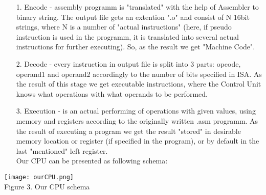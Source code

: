 \documentclass[11pt,a4paper]{article}
\begin{document}
\begin{enumerate}
	\item[1.] Encode - assembly programm is "translated" with the help of  Assembler to binary string. The output file gets an extention ".o" and consist of N 16bit strings, where N is a number of "actual instructions" (here, if pseudo instruction is used in the programm, it is translated into several actual instructions for further executing). So, as the result we get "Machine Code".
	\item[2.] Decode - every instruction in output file is split into 3 parts: opcode, operand1 and operand2 accordingly to the number of bits specified in ISA. As the result of this stage we get executable instructions, where the Control Unit knows what operations with what operands to be performed. 
	\item[3.] Execution - is an actual performing of operations with given values, using memory and registers according to the originally written .asm programm. As the result of executing a program we get the result "stored" in desirable memory location or register (if specified in the program), or by default in the last "mentioned" left register.\\
Our CPU can be presented as following schema:
\end{enumerate} 
\begin{center}
\texttt{[image: ourCPU.png]}\\
Figure 3. Our CPU schema
\end{center}

\newpage
\end{document}
